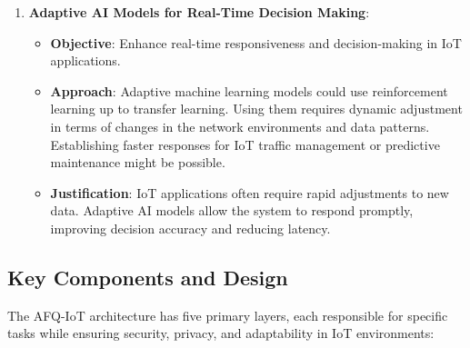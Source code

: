 \documentclass[12pt, oneside]{report}
\begin{document}
\begin{enumerate}
    \item \textbf{Adaptive AI Models for Real-Time Decision Making}:
    \begin{itemize}
        \item \textbf{Objective}: Enhance real-time responsiveness and decision-making in IoT applications.
        \item \textbf{Approach}: Adaptive machine learning models could use reinforcement learning up to transfer learning. Using them requires dynamic adjustment in terms of changes in the network environments and data patterns. Establishing faster responses for IoT traffic management or predictive maintenance might be possible.
        \item \textbf{Justification}: IoT applications often require rapid adjustments to new data. Adaptive AI models allow the system to respond promptly, improving decision accuracy and reducing latency.
    \end{itemize}
\end{enumerate}
\subsection{Key Components and Design}

The AFQ-IoT architecture has five primary layers, each responsible for specific tasks while ensuring security, privacy, and adaptability in IoT environments:
\end{document}

